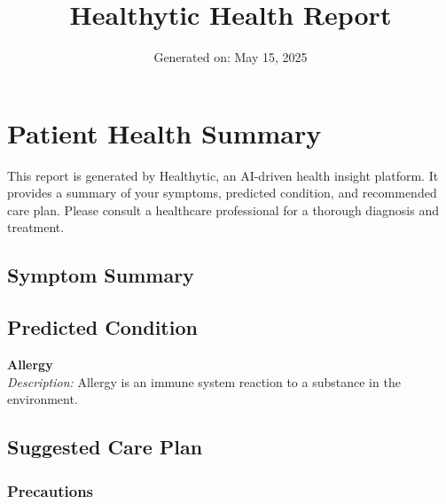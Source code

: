 \documentclass[a4paper,12pt]{article}
\title{\textbf{Healthytic Health Report}}
\author{}
\date{Generated on: May 15, 2025}
\begin{document}
\maketitle



\section*{Patient Health Summary}

This report is generated by Healthytic, an AI-driven health insight platform. It provides a summary of your symptoms, predicted condition, and recommended care plan. Please consult a healthcare professional for a thorough diagnosis and treatment.



\subsection*{Symptom Summary}

\begin{itemize}[leftmargin=*]



\end{itemize}



\subsection*{Predicted Condition}

\textbf{Allergy} \\

\textit{Description:} Allergy is an immune system reaction to a substance in the environment.



\subsection*{Suggested Care Plan}

\subsubsection*{Precautions}

\begin{itemize}[leftmargin=*]



\end{itemize}
\end{document}
